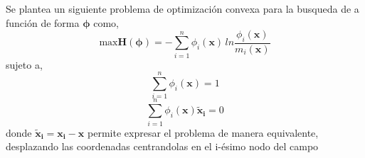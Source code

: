 Se plantea un siguiente problema de optimización convexa para la busqueda de a función de forma $\bm{\phi}$ como,
\begin{equation} 
\mbox{max} \bm{H} ( \bm{\phi} ) = - \sum_{i=1}^{n} \phi_i(\bm{x}) \, ln \frac{\phi_i (\bm{x})}{m_i(\bm{x})}  
\end{equation}
sujeto a,
\begin{equation} \label{restriccion1}
\sum_{i=1}^{n} \phi_i (\bm{x}) = 1 
\end{equation}
\begin{equation} \label{restriccion2}
\sum_{i=1}^{n} \phi_i (\bm{x}) \bm{\tilde{x}_i} = 0 
\end{equation}
donde $\bm{ \tilde{ x }_i } = \bm{x_i} - \bm{x} $ permite expresar el problema de manera equivalente, desplazando las coordenadas centrandolas en el i-ésimo nodo del campo\\


